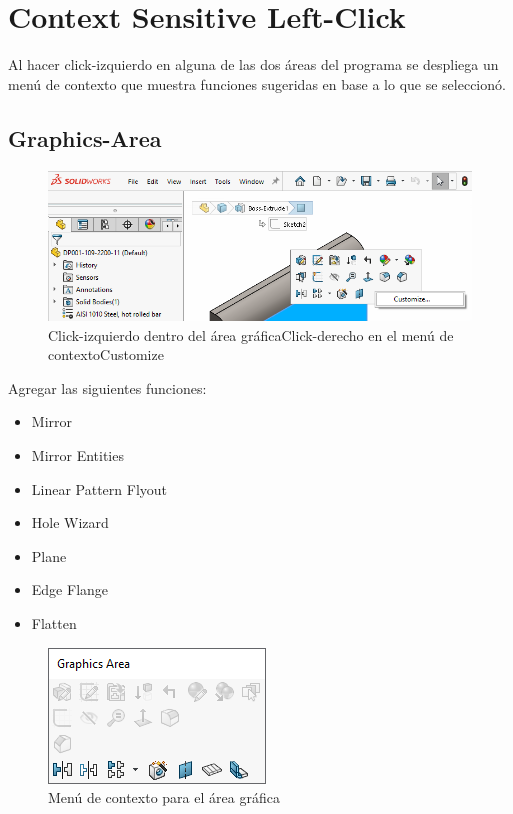 \documentclass[12pt,letterpaper,final]{report}
\begin{document}
\chapter{Context Sensitive Left-Click}

Al hacer click-izquierdo en alguna de las dos áreas del programa se despliega un menú de contexto que muestra funciones sugeridas en base a lo que se seleccionó.

\section{Graphics-Area}

\begin{figure}[H]
	\centering
	\includegraphics[width=0.85\linewidth, height=0.5\textheight,keepaspectratio]{Imagenes/solidworks_contextmenu_01}
	\caption{Click-izquierdo dentro del área gráfica\textrightarrow Click-derecho en el menú de contexto\textrightarrow Customize}
	\label{fig:solidworkscontextmenu01}
\end{figure}

Agregar las siguientes funciones:

\begin{itemize}
	\item Mirror
	\item Mirror Entities
	\item Linear Pattern Flyout
	\item Hole Wizard
	\item Plane
	\item Edge Flange
	\item Flatten
\end{itemize}

\begin{figure}[H]
	\centering
	\includegraphics[width=0.55\linewidth, height=0.5\textheight,keepaspectratio]{Imagenes/solidworks_contextmenu_02}
	\caption{Menú de contexto para el área gráfica}
	\label{fig:solidworkscontextmenu02}
\end{figure}
\end{document}
